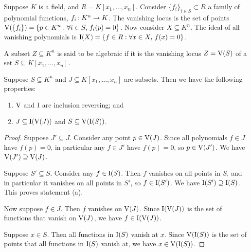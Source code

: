 \begin{definition}
    Suppose \(K\) is a field, and \(R = K[x_1,\hdots,x_n]\).
    Consider \({\{f_i\}}_{i \in S} \subset R\) a family of polynomial functions,
    \(f_i\colon K^n\to K\).
    The vanishing locus is the set of points
    \(\operatorname{V}(\{f_i\}) = \{p \in K^n: \forall i \in S,\,f_i(p) = 0\}\).
    Now consider \(X \subseteq K^n\).
    The ideal of all vanishing polynomials is
    \(\operatorname{I}(X) = \{f \in R: \forall x \in X,\,f(x) = 0\}\).
\end{definition}
\begin{definition}
    A subset \(Z \subseteq K^n\) is said to be algebraic
    if it is the vanishing locus \(Z = \operatorname{V}(S)\)
    of a set \(S \subseteq K[x_1,\hdots,x_n]\).
\end{definition}
\begin{lemma}\label{lem:iv-inclusion-reversing}
    Suppose \(S \subseteq K^n\) and \(J \subseteq K[x_1,\hdots,x_n]\) are subsets.
    Then we have the following properties:
    \begin{enumerate}[label={(\alph*)}, itemsep=0mm]
        \item \(\operatorname{V}\) and \(\operatorname{I}\) are inclusion reversing; and
        \item \(J \subseteq \operatorname{I}(\operatorname{V}(J))\) and \(S \subseteq \operatorname{V}(\operatorname{I}(S))\).
    \end{enumerate}
\end{lemma}
\begin{proof}
    Suppose \(J' \subseteq J\).
    Consider any point \(p \in \operatorname{V}(J)\).
    Since all polynomials \(f \in J\) have \(f(p) = 0\),
    in particular any \(f \in J'\) have \(f(p) = 0\),
    so \(p \in \operatorname{V}(J')\).
    We have \(\operatorname{V}(J') \supseteq \operatorname{V}(J)\).

    Suppose \(S' \subseteq S\).
    Consider any \(f \in \operatorname{I}(S)\).
    Then \(f\) vanishes on all points in \(S\),
    and in particular it vanishes on all points in \(S'\),
    so \(f \in \operatorname{I}(S')\).
    We have \(\operatorname{I}(S') \supseteq \operatorname{I}(S)\).
    This proves statement (a).

    \medskip

    Now suppose \(f \in J\).
    Then \(f\) vanishes on \(\operatorname{V}(J)\).
    Since \(\operatorname{I}(\operatorname{V}(J))\) is the set of functions that vanish on \(\operatorname{V}(J)\),
    we have \(f \in \operatorname{I}(\operatorname{V}(J))\).

    Suppose \(x \in S\).
    Then all functions in \(\operatorname{I}(S)\) vanish at \(x\).
    Since \(\operatorname{V}(\operatorname{I}(S))\) is the set of points that all functions in \(\operatorname{I}(S)\) vanish at,
    we have \(x \in \operatorname{V}(\operatorname{I}(S))\).
\end{proof}
